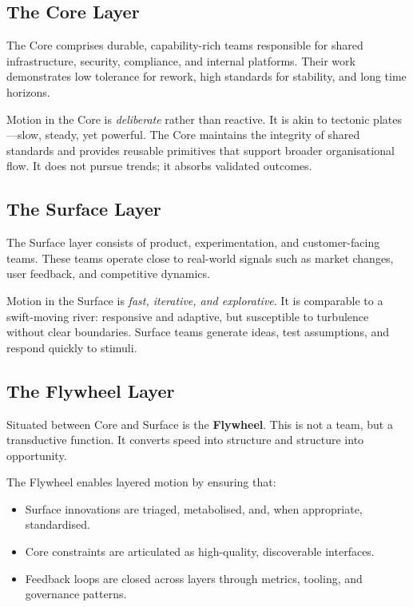 \documentclass[12pt]{article}
\begin{document}
\subsection*{The Core Layer}

The Core comprises durable, capability-rich teams responsible for shared infrastructure, security, compliance, and internal platforms. Their work demonstrates low tolerance for rework, high standards for stability, and long time horizons.

Motion in the Core is \textit{deliberate} rather than reactive. It is akin to tectonic plates—slow, steady, yet powerful. The Core maintains the integrity of shared standards and provides reusable primitives that support broader organisational flow. It does not pursue trends; it absorbs validated outcomes.

\subsection*{The Surface Layer}

The Surface layer consists of product, experimentation, and customer-facing teams. These teams operate close to real-world signals such as market changes, user feedback, and competitive dynamics.

Motion in the Surface is \textit{fast, iterative, and explorative}. It is comparable to a swift-moving river: responsive and adaptive, but susceptible to turbulence without clear boundaries. Surface teams generate ideas, test assumptions, and respond quickly to stimuli.

\subsection*{The Flywheel Layer}

Situated between Core and Surface is the \textbf{Flywheel}. This is not a team, but a transductive function. It converts speed into structure and structure into opportunity.

The Flywheel enables layered motion by ensuring that:
\begin{itemize}
    \item Surface innovations are triaged, metabolised, and, when appropriate, standardised.
    \item Core constraints are articulated as high-quality, discoverable interfaces.
    \item Feedback loops are closed across layers through metrics, tooling, and governance patterns.
\end{itemize}
\end{document}

